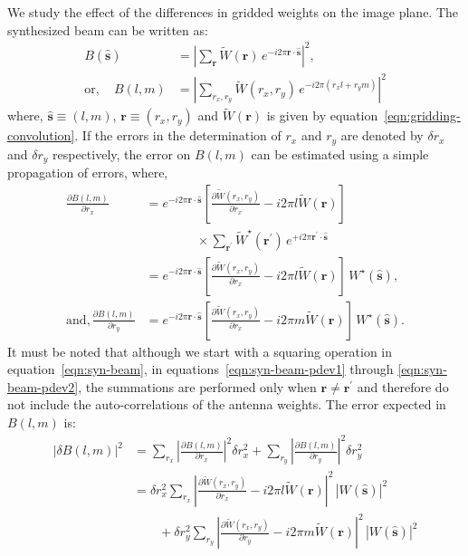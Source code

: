 \documentclass[a4paper,fleqn,usenatbib]{../mnras}
\begin{document}
We study the effect of the differences in gridded weights on the image plane. 
The synthesized beam can be written as:
\begin{align}\label{eqn:syn-beam}
  B(\hat{\mathbf{s}}) &= \left| \sum_\mathbf{r} \widetilde{W}(\mathbf{r})\,e^{-i2\pi\mathbf{r}\cdot\hat{\mathbf{s}}}\right|^2, \\
  \textrm{or}, \quad B(l,m) &= \left| \sum_{r_x,r_y} \widetilde{W}(r_x,r_y)\,e^{-i2\pi(r_x l + r_y m)}\right|^2 
\end{align}
where, $\hat{\mathbf{s}}\equiv (l,m)$, $\mathbf{r}\equiv (r_x,r_y)$ and 
$\widetilde{W}(\mathbf{r})$ is given by equation~\ref{eqn:gridding-convolution}.
If the errors in the determination of $r_x$ and $r_y$ are denoted by 
$\delta r_x$ and $\delta r_y$ respectively, the error on $B(l,m)$ can be 
estimated using a simple propagation of errors, where,
\begin{align}
  \frac{\partial{B}(l,m)}{\partial{r_x}} &= e^{-i2\pi\mathbf{r}\cdot\hat{\mathbf{s}}}\left[\frac{\partial{\widetilde{W}(r_x,r_y)}}{\partial{r_x}} - i 2\pi l\widetilde{W}(\mathbf{r})\right] \label{eqn:syn-beam-pdev1}\\
  &\qquad\qquad \times \sum_{\mathbf{r}^\prime} \widetilde{W}^\star(\mathbf{r}^\prime)\,e^{+i2\pi\mathbf{r}^\prime\cdot \hat{\mathbf{s}}} \\
  &= e^{-i2\pi\mathbf{r}\cdot\hat{\mathbf{s}}}\left[\frac{\partial{\widetilde{W}(r_x,r_y)}}{\partial{r_x}} - i2\pi l\widetilde{W}(\mathbf{r})\right]\,W^\star(\hat{\mathbf{s}}), \\
  \textrm{and},\frac{\partial{B}(l,m)}{\partial{r_y}} &= e^{-i2\pi\mathbf{r}\cdot\hat{\mathbf{s}}}\left[\frac{\partial{\widetilde{W}(r_x,r_y)}}{\partial{r_x}} - i2\pi m\widetilde{W}(\mathbf{r})\right]\,W^\star(\hat{\mathbf{s}}). \label{eqn:syn-beam-pdev2}
\end{align}
It must be noted that although we start with a squaring operation in 
equation~\ref{eqn:syn-beam}, in equations~\ref{eqn:syn-beam-pdev1} through 
\ref{eqn:syn-beam-pdev2}, the summations are performed only when 
$\mathbf{r}\ne \mathbf{r}^\prime$ and therefore do not include the 
auto-correlations of the antenna weights. The error expected in $B(l,m)$ is:
\begin{align}
  \left|\delta B(l,m)\right|^2 &= \sum_{r_x}\left|\frac{\partial{B}(l,m)}{\partial{r_x}}\right|^2 \delta r_x^2 + \sum_{r_y}\left|\frac{\partial{B}(l,m)}{\partial{r_y}}\right|^2 \delta r_y^2 \\
  &= \delta r_x^2 \sum_{r_x}\left|\frac{\partial{\widetilde{W}(r_x,r_y)}}{\partial{r_x}} - i2\pi l\widetilde{W}(\mathbf{r})\right|^2\,\left|W(\hat{\mathbf{s}})\right|^2 \nonumber\\
  &\qquad + \delta r_y^2 \sum_{r_y}\left|\frac{\partial{\widetilde{W}(r_x,r_y)}}{\partial{r_y}} - i2\pi m\widetilde{W}(\mathbf{r})\right|^2\,\left|W(\hat{\mathbf{s}})\right|^2
\end{align}
\end{document}
